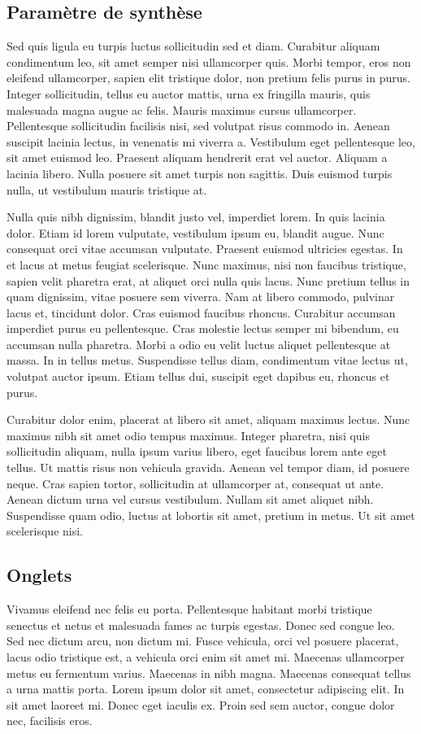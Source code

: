 	\subsection{Paramètre de synthèse}
		Sed quis ligula eu turpis luctus sollicitudin sed et diam. Curabitur aliquam condimentum leo, sit amet semper nisi ullamcorper quis. Morbi tempor, eros non eleifend ullamcorper, sapien elit tristique dolor, non pretium felis purus in purus. Integer sollicitudin, tellus eu auctor mattis, urna ex fringilla mauris, quis malesuada magna augue ac felis. Mauris maximus cursus ullamcorper. Pellentesque sollicitudin facilisis nisi, sed volutpat risus commodo in. Aenean suscipit lacinia lectus, in venenatis mi viverra a. Vestibulum eget pellentesque leo, sit amet euismod leo. Praesent aliquam hendrerit erat vel auctor. Aliquam a lacinia libero. Nulla posuere sit amet turpis non sagittis. Duis euismod turpis nulla, ut vestibulum mauris tristique at.

		Nulla quis nibh dignissim, blandit justo vel, imperdiet lorem. In quis lacinia dolor. Etiam id lorem vulputate, vestibulum ipsum eu, blandit augue. Nunc consequat orci vitae accumsan vulputate. Praesent euismod ultricies egestas. In et lacus at metus feugiat scelerisque. Nunc maximus, nisi non faucibus tristique, sapien velit pharetra erat, at aliquet orci nulla quis lacus. Nunc pretium tellus in quam dignissim, vitae posuere sem viverra. Nam at libero commodo, pulvinar lacus et, tincidunt dolor. Cras euismod faucibus rhoncus. Curabitur accumsan imperdiet purus eu pellentesque. Cras molestie lectus semper mi bibendum, eu accumsan nulla pharetra. Morbi a odio eu velit luctus aliquet pellentesque at massa. In in tellus metus. Suspendisse tellus diam, condimentum vitae lectus ut, volutpat auctor ipsum. Etiam tellus dui, suscipit eget dapibus eu, rhoncus et purus.

		Curabitur dolor enim, placerat at libero sit amet, aliquam maximus lectus. Nunc maximus nibh sit amet odio tempus maximus. Integer pharetra, nisi quis sollicitudin aliquam, nulla ipsum varius libero, eget faucibus lorem ante eget tellus. Ut mattis risus non vehicula gravida. Aenean vel tempor diam, id posuere neque. Cras sapien tortor, sollicitudin at ullamcorper at, consequat ut ante. Aenean dictum urna vel cursus vestibulum. Nullam sit amet aliquet nibh. Suspendisse quam odio, luctus at lobortis sit amet, pretium in metus. Ut sit amet scelerisque nisi. 

	\subsection{Onglets}
		Vivamus eleifend nec felis eu porta. Pellentesque habitant morbi tristique senectus et netus et malesuada fames ac turpis egestas. Donec sed congue leo. Sed nec dictum arcu, non dictum mi. Fusce vehicula, orci vel posuere placerat, lacus odio tristique est, a vehicula orci enim sit amet mi. Maecenas ullamcorper metus eu fermentum varius. Maecenas in nibh magna. Maecenas consequat tellus a urna mattis porta. Lorem ipsum dolor sit amet, consectetur adipiscing elit. In sit amet laoreet mi. Donec eget iaculis ex. Proin sed sem auctor, congue dolor nec, facilisis eros.

